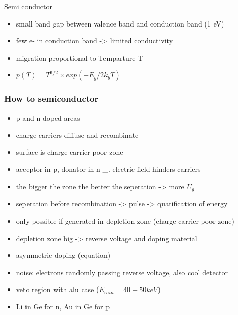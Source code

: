 \documentclass[aspectratio=1610, 9pt]{beamer}
\begin{document}
\begin{frame}{Semi conductor}
  \begin{itemize}
    \item small band gap between valence band and conduction band (1 eV)
    \item few e- in conduction band -> limited conductivity
    \item migration proportional to Temparture T
    \item $p(T) = T^{3/2} \times exp(-E_g / 2 k_b T)$
  \end{itemize}
\end{frame}

\begin{frame}\frametitle{How to semiconductor}
  \begin{itemize}
    \item p and n doped areas
    \item charge carriers diffuse and recombinate
    \item surface is charge carrier poor zone
    \item  acceptor in p, donator in n _. electric field hinders carriers
    \item the bigger the zone the better the seperation -> more $U_g$
    \item seperation before recombination -> pulse -> quatification of energy
    \item only possible if generated in depletion zone (charge carrier poor zone)
    \item depletion zone big -> reverse voltage and doping material
    \item asymmetric doping (equation)
    \item noise: electrons randomly passing reverse voltage, also cool detector
    \item veto region with alu case ($E_{min} = 40 - 50 keV$)
    \item Li in Ge for n, Au in Ge for p
  \end{itemize}
\end{frame}
\end{document}
